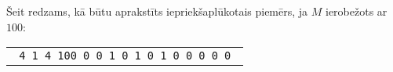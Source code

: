 \documentclass{boi2014-lv}
\begin{document}
		Šeit redzams, kā būtu aprakstīts iepriekšaplūkotais piemērs, ja $M$ ierobežots ar
    $100$:

    \begin{center}
        \begin{tabular}{p{4cm}}
            {\tt
                4 1 4 100 \newline
                0 0 0 1 \newline
                0 0 1 0 \newline
                0 1 0 0 \newline
                1 0 0 0
            }
        \end{tabular}
    \end{center}
\end{document}

